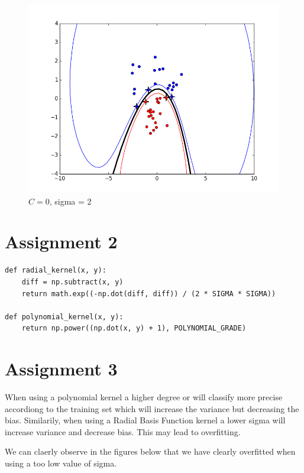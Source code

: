 \documentclass{article}
\begin{document}
\begin{figure}[H]
\centering
\includegraphics[scale = 0.5]{figure_basic_radial.png}
\caption{$C=0$, sigma =  2}
\label{fig:3}
\end{figure}



\section*{Assignment 2}

\begin{lstlisting}
def radial_kernel(x, y):
    diff = np.subtract(x, y)
    return math.exp((-np.dot(diff, diff)) / (2 * SIGMA * SIGMA))

def polynomial_kernel(x, y):
	return np.power((np.dot(x, y) + 1), POLYNOMIAL_GRADE)
\end{lstlisting}

\section*{Assignment 3}

When using a polynomial kernel a higher degree or will classify more precise accordiong to the training set which will increase 
the variance but decreasing the bias. 
Similarily, when using a Radial Basis Function kernel a lower sigma will increase variance and decrease bias. 
This may lead to overfitting. 

We can claerly observe in the figures below that we have clearly overfitted when using a too low value of sigma. 
\end{document}
